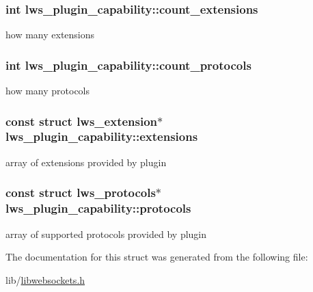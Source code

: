 \subsubsection[{\texorpdfstring{count\+\_\+extensions}{count\_extensions}}]{\setlength{\rightskip}{0pt plus 5cm}int lws\+\_\+plugin\+\_\+capability\+::count\+\_\+extensions}\hypertarget{structlws__plugin__capability_abcf51db969522fdda9aaf902e65739d3}{}\label{structlws__plugin__capability_abcf51db969522fdda9aaf902e65739d3}
how many extensions 
\subsubsection[{\texorpdfstring{count\+\_\+protocols}{count\_protocols}}]{\setlength{\rightskip}{0pt plus 5cm}int lws\+\_\+plugin\+\_\+capability\+::count\+\_\+protocols}\hypertarget{structlws__plugin__capability_ae38f7cf1246b9ca3af3cbf9d46b7090f}{}\label{structlws__plugin__capability_ae38f7cf1246b9ca3af3cbf9d46b7090f}
how many protocols 
\subsubsection[{\texorpdfstring{extensions}{extensions}}]{\setlength{\rightskip}{0pt plus 5cm}const struct {\bf lws\+\_\+extension}$\ast$ lws\+\_\+plugin\+\_\+capability\+::extensions}\hypertarget{structlws__plugin__capability_a7936f0eb93d79dea76b903d0f8a5f623}{}\label{structlws__plugin__capability_a7936f0eb93d79dea76b903d0f8a5f623}
array of extensions provided by plugin 
\subsubsection[{\texorpdfstring{protocols}{protocols}}]{\setlength{\rightskip}{0pt plus 5cm}const struct {\bf lws\+\_\+protocols}$\ast$ lws\+\_\+plugin\+\_\+capability\+::protocols}\hypertarget{structlws__plugin__capability_a6a4d9d01e770f378ddadc77b37522033}{}\label{structlws__plugin__capability_a6a4d9d01e770f378ddadc77b37522033}
array of supported protocols provided by plugin 

The documentation for this struct was generated from the following file\+:\begin{DoxyCompactItemize}
\item 
lib/\hyperlink{libwebsockets_8h}{libwebsockets.\+h}\end{DoxyCompactItemize}

